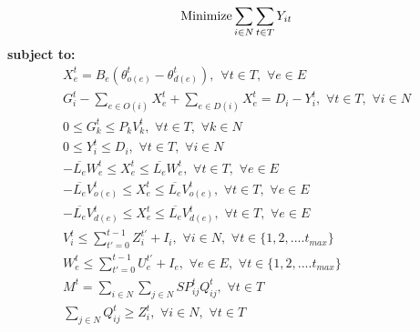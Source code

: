 \begin{equation}
\textnormal{Minimize}\sum_{i \in N} \sum_{t \in T} Y_{it}
\end{equation}
\textbf{subject to:}
\begin{eqnarray}
X_e^t = B_e (\theta_{o(e)}^t - \theta_{d(e)}^t), \hspace{5pt} \forall t \in T, \hspace{4pt} \forall e \in E\\
G_i^t - \sum_{e \in O(i)} X_e^t + \sum_{e \in D(i)} X_e^t = D_i-Y_i^t, \hspace{4pt} \forall t \in T, \hspace{4pt} \forall i \in N\\
0\leq G_k^t \leq P_{k} V_{k}^t, \hspace{4pt} \forall t \in T, \hspace{4pt} \forall k \in N\\
0\leq Y_i^t \leq D_i, \hspace{4pt} \forall t \in T, \hspace{4pt} \forall i \in N\\
-\overline{L_e}W_{e}^t \leq X_{e}^t \leq \overline{L_e}W_{e}^t, \hspace{4pt} \forall t \in T, \hspace{4pt} \forall e \in E\\
-\overline{L_e}V_{o(e)}^t \leq X_{e}^t \leq \overline{L_e}V_{o(e)}^t, \hspace{4pt} \forall t \in T, \hspace{4pt} \forall e \in E\\
-\overline{L_e}V_{d(e)}^t \leq X_{e}^t \leq \overline{L_e}V_{d(e)}^t, \hspace{4pt} \forall t \in T, \hspace{4pt} \forall e \in E\\
V_i^t \leq \sum_{t'=0}^{t-1} Z_i^{t'}+I_i, \hspace{4pt} \forall i \in N, \hspace{4pt} \forall t\in \{1,2,....t_{max}\}\\
W_{e}^t \leq \sum_{t'=0}^{t-1} U_{e}^{t'}+I_e, \hspace{4pt} \forall e \in E, \hspace{4pt} \forall t\in \{1,2,....t_{max}\}\\
M^t = \sum_{i \in N} \sum_{j \in N} {SP}_{ij}^t Q_{ij}^{t},  \hspace{4pt} \forall t \in T\\
\sum_{j \in N} Q_{ij}^t \geq Z_i^t, \hspace{4pt} \forall i \in N, \hspace{4pt} \forall t \in T\\

\end{eqnarray}
